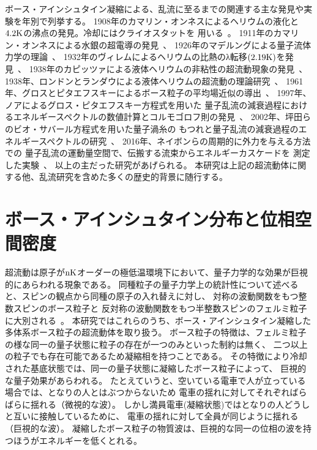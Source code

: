 \documentclass[12pt,a4paper]{jbook}
\begin{document}
		ボース・アインシュタイン凝縮による、乱流に至るまでの関連する主な発見や実験を年別で列挙する。
		1908年のカマリン・オンネスによるヘリウムの液化と$4.2{\rm K}$の沸点の発見。冷却にはクライオスタットを
        	用いる~\cite{Onnes1}。
        	1911年のカマリン・オンネスによる水銀の超電導の発見~\cite{Onnes2}、
        	1926年のマデルングによる量子流体力学の理論~\cite{Madelung1,Madelung2}、
        	1932年のヴィレムによるヘリウムの比熱のλ転移$(2.19{\rm K})$を発見~\cite{Willem}、
        	1938年のカピッツァによる液体ヘリウムの非粘性の超流動現象の発見~\cite{Kapitza}、
        	1938年、ロンドンとランダウによる液体ヘリウムの超流動の理論研究~\cite{London}、
        	1961年、グロスとピタエフスキーによるボース粒子の平均場近似の導出~\cite{Gross,Pitaevskii1}、
        	1997年、ノアによるグロス・ピタエフスキー方程式を用いた
        	量子乱流の減衰過程におけるエネルギースペクトルの数値計算とコルモゴロフ則の発見~\cite{Nore}、
        	2002年、坪田らのビオ・サバール方程式を用いた量子渦糸の
        	もつれと量子乱流の減衰過程のエネルギースペクトルの研究~\cite{Araki}、
        	2016年、ネイボンらの周期的に外力を与える方法での
        	量子乱流の運動量空間で、伝搬する流束からエネルギーカスケードを
        	測定した実験~\cite{Navon}、
		以上の主だった研究があげられる。
        	本研究は上記の超流動体に関する他、乱流研究を含めた多くの歴史的背景に随行する。


		\section{ボース・アインシュタイン分布と位相空間密度}
		超流動は原子が${\rm nK}$オーダーの極低温環境下において、量子力学的な効果が巨視的にあらわれる現象である。
		同種粒子の量子力学上の統計性について述べると、スピンの観点から同種の原子の入れ替えに対し、
        	対称の波動関数をもつ整数スピンのボース粒子と
		反対称の波動関数をもつ半整数スピンのフェルミ粒子に大別される~\cite{Fermi,Dirac}。
		本研究ではこれらのうち、ボース・アインシュタイン凝縮した多体系ボース粒子の超流動体を取り扱う。
		ボース粒子の特徴は、フェルミ粒子の様な同一の量子状態に粒子の存在が一つのみといった制約は無く、
		二つ以上の粒子でも存在可能であるため凝縮相を持つことである。
		その特徴により冷却された基底状態では、同一の量子状態に凝縮したボース粒子によって、
        	巨視的な量子効果があらわれる。
        	たとえていうと、空いている電車で人が立っている場合では、となりの人とはぶつからないため
        	電車の揺れに対してそれぞればらばらに揺れる（微視的な波）。
        	しかし満員電車(凝縮状態)ではとなりの人どうしと互いに接触しているために、
        	電車の揺れに対して全員が同じように揺れる（巨視的な波）。
        	凝縮したボース粒子の物質波は、巨視的な同一の位相の波を持つほうがエネルギーを低くとれる。
\end{document}
